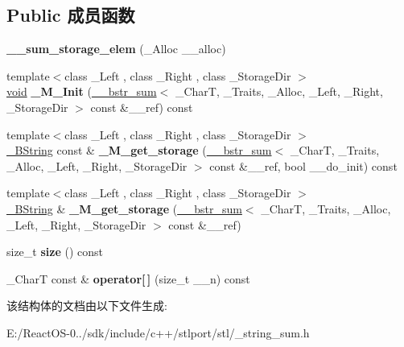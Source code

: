 \subsection*{Public 成员函数}
\begin{DoxyCompactItemize}
\item 
\mbox{\label{struct____sum__storage__elem_ae443902509a235639f99cb5637ccc23f}} 
{\bfseries \+\_\+\+\_\+sum\+\_\+storage\+\_\+elem} (\+\_\+\+Alloc \+\_\+\+\_\+alloc)
\item 
\mbox{\label{struct____sum__storage__elem_a431afc08a9b8161f6cb80cf5893bd4a5}} 
{\footnotesize template$<$class \+\_\+\+Left , class \+\_\+\+Right , class \+\_\+\+Storage\+Dir $>$ }\\\hyperlink{interfacevoid}{void} {\bfseries \+\_\+\+M\+\_\+\+Init} (\hyperlink{class____bstr__sum}{\+\_\+\+\_\+bstr\+\_\+sum}$<$ \+\_\+\+CharT, \+\_\+\+Traits, \+\_\+\+Alloc, \+\_\+\+Left, \+\_\+\+Right, \+\_\+\+Storage\+Dir $>$ const \&\+\_\+\+\_\+ref) const
\item 
\mbox{\label{struct____sum__storage__elem_aaf9b01f6c509aeb4b59922535d3f445b}} 
{\footnotesize template$<$class \+\_\+\+Left , class \+\_\+\+Right , class \+\_\+\+Storage\+Dir $>$ }\\\hyperlink{classbasic__string}{\+\_\+\+B\+String} const  \& {\bfseries \+\_\+\+M\+\_\+get\+\_\+storage} (\hyperlink{class____bstr__sum}{\+\_\+\+\_\+bstr\+\_\+sum}$<$ \+\_\+\+CharT, \+\_\+\+Traits, \+\_\+\+Alloc, \+\_\+\+Left, \+\_\+\+Right, \+\_\+\+Storage\+Dir $>$ const \&\+\_\+\+\_\+ref, bool \+\_\+\+\_\+do\+\_\+init) const
\item 
\mbox{\label{struct____sum__storage__elem_a120cf54e0171faffea3f4f36e3b8718e}} 
{\footnotesize template$<$class \+\_\+\+Left , class \+\_\+\+Right , class \+\_\+\+Storage\+Dir $>$ }\\\hyperlink{classbasic__string}{\+\_\+\+B\+String} \& {\bfseries \+\_\+\+M\+\_\+get\+\_\+storage} (\hyperlink{class____bstr__sum}{\+\_\+\+\_\+bstr\+\_\+sum}$<$ \+\_\+\+CharT, \+\_\+\+Traits, \+\_\+\+Alloc, \+\_\+\+Left, \+\_\+\+Right, \+\_\+\+Storage\+Dir $>$ const \&\+\_\+\+\_\+ref)
\item 
\mbox{\label{struct____sum__storage__elem_ae1198a096180b085031c373ec7517343}} 
size\+\_\+t {\bfseries size} () const
\item 
\mbox{\label{struct____sum__storage__elem_a32221fdad99444de2f73f3b449ba746e}} 
\+\_\+\+CharT const  \& {\bfseries operator\mbox{[}$\,$\mbox{]}} (size\+\_\+t \+\_\+\+\_\+n) const
\end{DoxyCompactItemize}


该结构体的文档由以下文件生成\+:\begin{DoxyCompactItemize}
\item 
E\+:/\+React\+O\+S-\/0../sdk/include/c++/stlport/stl/\+\_\+string\+\_\+sum.\+h\end{DoxyCompactItemize}

